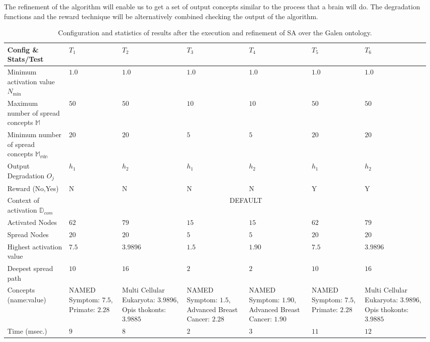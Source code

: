The refinement of the algorithm will enable us to get
a set of output concepts similar to the process that a brain will do. The degradation functions
and the reward technique will be alternatively combined checking the output of the algorithm. 

\begin{table*}[!h]
\renewcommand{\arraystretch}{1.3}
\begin{center}
\begin{tabular}{|p{3cm}|p{1.5cm}|p{1.5cm}|p{1.5cm}|p{1.5cm}|p{1.5cm}|p{1.5cm}|}
\hline
        \textbf{Config \& Stats/Test}&$T_1$&$T_2$&$T_3$&$T_4$&$T_5$&$T_6$\\ \hline
        \hline
        Minimum activation value $N_{\min}$ &$1.0$ &$1.0$ &$1.0$ &$1.0$&$1.0$&$1.0$ \\ \hline
	Maximum number of spread concepts $\mathbb{M}$&$50$ &$50$ &$10$ &$10$&$50$&$50$\\ \hline
	Minimum number of spread concepts $\mathbb{M_{\min}}$&$20$ &$20$ &$5$ &$5$&$20$&$20$  \\ \hline
	Output Degradation $O_j$ & $h_1$ &$h_2$ &$h_1$ &$h_2$&$h_1$&$h_2$\\ \hline
	Reward (No,Yes) &N &N &N &N&Y&Y\\ \hline
	\hline
	Context of activation $\mathbb{D}_{com}$&\multicolumn{6}{|c|}{DEFAULT} \\ \hline
	Activated Nodes &$62$ &$79$ &$15$ &$15$&$62$&$79$ \\ \hline
	Spread Nodes &$20$ &$20$ &$5$ &$5$&$20$&$20$ \\ \hline
	Highest activation value &$7.5$ &$3.9896$ &$1.5$ &$1.90$&$7.5$&$3.9896$\\ \hline
	Deepest spread path &$10$ &$16$&$2$ &$2$&$10$&$16$\\ \hline
	Concepts (name:value) & NAMED Symptom: $7.5$, Primate: $2.28$ &Multi Cellular Eukaryota: $3.9896$, Opis thokonts: $3.9885$ &NAMED Symptom: $1.5$, Advanced Breast Cancer: $2.28$ &NAMED Symptom: $1.90$, Advanced Breast Cancer: $1.90$&NAMED Symptom: $7.5$, Primate: $2.28$&Multi Cellular Eukaryota: $3.9896$, Opis thokonts: $3.9885$ \\ \hline
	Time (msec.) & $9$ &$8$ &$2$ &$3$&$11$&$12$ \\ \hline
\end{tabular}
  \caption{Configuration and statistics of results after the execution and refinement of SA over the Galen ontology.}
  \label{tabla:test-restricciones}
  \end{center}
\end{table*} 

